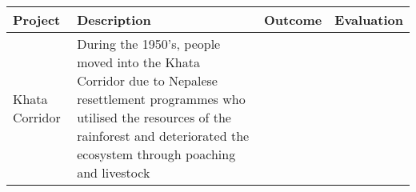 	\begin{table}[H]
		\centering
		\begin{tabular}{p{3cm}|p{4.5cm}|p{4.5cm}|p{4.5cm}}
			\textbf{Project}	& \textbf{Description}		& \textbf{Outcome}		& \textbf{Evaluation}	\\ \hline
			Khata Corridor		& During the 1950's, people moved into the Khata Corridor due to Nepalese resettlement programmes who utilised the resources of the rainforest and deteriorated the ecosystem through poaching and livestock 
		\end{tabular}
	\end{table}
